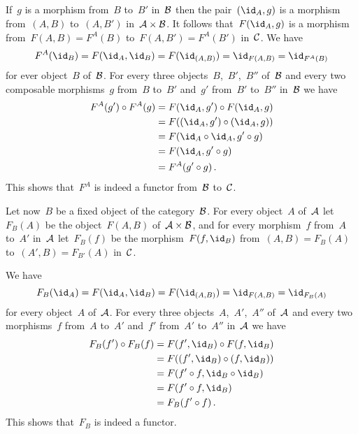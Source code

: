 \subsection{}





\subsubsection{}

If~$g$ is a morphism from~$B$ to~$B'$ in~$\mathcal{B}$ then the pair~$(\id_A, g)$ is a morphism from~$(A, B)$ to~$(A, B')$ in~$\mathcal{A} \times \mathcal{B}$.
It follows that~$F(\id_A, g)$ is a morphism from~$F(A, B) = F^A(B)$ to~$F(A, B') = F^A(B')$ in~$\mathcal{C}$.
We have
\[
	F^A(\id_B)
	=
	F(\id_A, \id_B)
	=
	F( \id_{(A, B)} )
	=
	\id_{F(A, B)}
	=
	\id_{F^A(B)}
\]
for ever object~$B$ of~$\mathcal{B}$.
For every three objects~$B$,~$B'$,~$B''$ of~$\mathcal{B}$ and every two composable morphisms~$g$ from~$B$ to~$B'$ and~$g'$ from~$B'$ to~$B''$ in~$\mathcal{B}$ we have
\begin{align*}
	F^A(g') \circ F^A(g)
	&=
	F(\id_A, g') \circ F(\id_A, g)
	\\
	&=
	F( (\id_A, g') \circ (\id_A, g) )
	\\
	&=
	F(\id_A \circ \id_A, g' \circ g)
	\\
	&=
	F(\id_A, g' \circ g)
	\\
	&=
	F^A(g' \circ g) \,.
\end{align*}
This shows that~$F^A$ is indeed a functor from~$\mathcal{B}$ to~$\mathcal{C}$.

Let now~$B$ be a fixed object of the category~$\mathcal{B}$.
For every object~$A$ of~$\mathcal{A}$ let~$F_B(A)$ be the object~$F(A, B)$ of~$\mathcal{A} \times \mathcal{B}$, and for every morphism~$f$ from~$A$ to~$A'$ in~$\mathcal{A}$ let~$F_B(f)$ be the morphism~$F(f, \id_B)$ from~$(A, B) = F_B(A)$ to~$(A', B) = F_{B'}(A)$ in~$\mathcal{C}$.

We have
\[
	F_B(\id_A)
	=
	F(\id_A, \id_B)
	=
	F( \id_{(A, B)} )
	=
	\id_{F(A, B)}
	=
	\id_{F_B(A)}
\]
for every object~$A$ of~$\mathcal{A}$.
For every three objects~$A$,~$A'$,~$A''$ of~$\mathcal{A}$ and every two morphisms~$f$ from~$A$ to~$A'$ and~$f'$ from~$A'$ to~$A''$ in~$\mathcal{A}$ we have
\begin{align*}
	F_B(f') \circ F_B(f)
	&=
	F(f', \id_B) \circ F(f, \id_B)
	\\
	&=
	F( (f', \id_B) \circ (f, \id_B) )
	\\
	&=
	F( f' \circ f, \id_B \circ \id_B )
	\\
	&=
	F( f' \circ f, \id_B )
	\\
	&=
	F_B( f' \circ f ) \,.
\end{align*}
This shows that~$F_B$ is indeed a functor.





